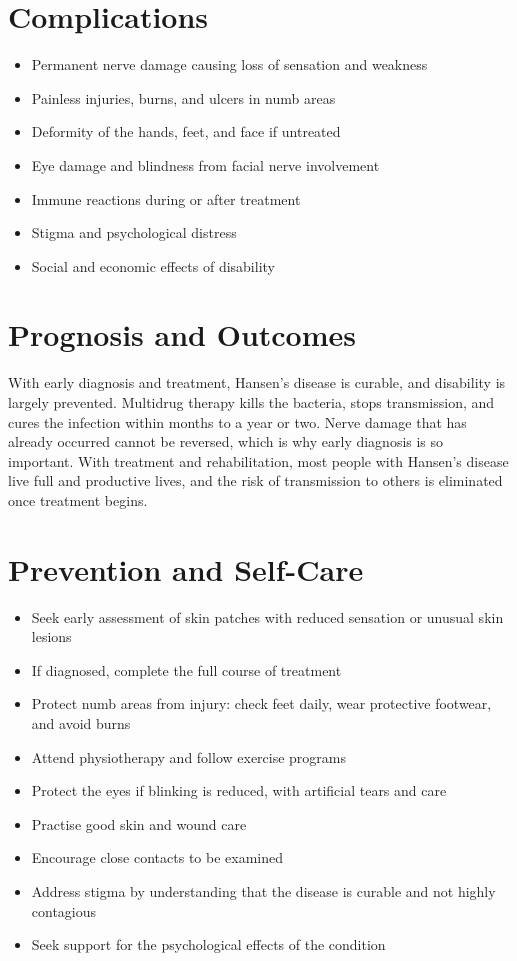 \section*{Complications}
\begin{itemize}
    \item Permanent nerve damage causing loss of sensation and weakness
    \item Painless injuries, burns, and ulcers in numb areas
    \item Deformity of the hands, feet, and face if untreated
    \item Eye damage and blindness from facial nerve involvement
    \item Immune reactions during or after treatment
    \item Stigma and psychological distress
    \item Social and economic effects of disability
\end{itemize}

\section*{Prognosis and Outcomes}
With early diagnosis and treatment, Hansen's disease is curable, and disability is largely prevented. Multidrug therapy kills the bacteria, stops transmission, and cures the infection within months to a year or two. Nerve damage that has already occurred cannot be reversed, which is why early diagnosis is so important. With treatment and rehabilitation, most people with Hansen's disease live full and productive lives, and the risk of transmission to others is eliminated once treatment begins.

\section*{Prevention and Self-Care}
\begin{itemize}
    \item Seek early assessment of skin patches with reduced sensation or unusual skin lesions
    \item If diagnosed, complete the full course of treatment
    \item Protect numb areas from injury: check feet daily, wear protective footwear, and avoid burns
    \item Attend physiotherapy and follow exercise programs
    \item Protect the eyes if blinking is reduced, with artificial tears and care
    \item Practise good skin and wound care
    \item Encourage close contacts to be examined
    \item Address stigma by understanding that the disease is curable and not highly contagious
    \item Seek support for the psychological effects of the condition
\end{itemize}

